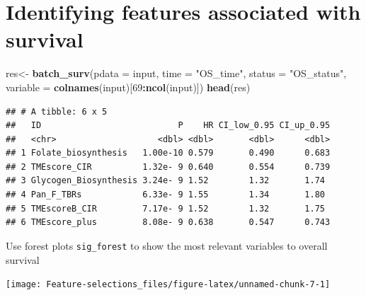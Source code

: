 \documentclass[
  12pt,
]{book}
\newenvironment{Shaded}{\begin{snugshade}}{\end{snugshade}}
\newcommand{\AttributeTok}[1]{\textcolor[rgb]{0.13,0.29,0.53}{#1}}
\newcommand{\DecValTok}[1]{\textcolor[rgb]{0.00,0.00,0.81}{#1}}
\newcommand{\FunctionTok}[1]{\textcolor[rgb]{0.13,0.29,0.53}{\textbf{#1}}}
\newcommand{\NormalTok}[1]{#1}
\newcommand{\OtherTok}[1]{\textcolor[rgb]{0.56,0.35,0.01}{#1}}
\newcommand{\SpecialCharTok}[1]{\textcolor[rgb]{0.81,0.36,0.00}{\textbf{#1}}}
\newcommand{\StringTok}[1]{\textcolor[rgb]{0.31,0.60,0.02}{#1}}
\begin{document}
\hypertarget{identifying-features-associated-with-survival}{%
\section{Identifying features associated with survival}\label{identifying-features-associated-with-survival}}

\begin{Shaded}
\begin{Highlighting}[]
\NormalTok{res}\OtherTok{\textless{}{-}} \FunctionTok{batch\_surv}\NormalTok{(}\AttributeTok{pdata    =}\NormalTok{ input,}
                 \AttributeTok{time     =} \StringTok{"OS\_time"}\NormalTok{, }
                 \AttributeTok{status   =} \StringTok{"OS\_status"}\NormalTok{, }
                 \AttributeTok{variable =} \FunctionTok{colnames}\NormalTok{(input)[}\DecValTok{69}\SpecialCharTok{:}\FunctionTok{ncol}\NormalTok{(input)])}
\FunctionTok{head}\NormalTok{(res)}
\end{Highlighting}
\end{Shaded}

\begin{verbatim}
## # A tibble: 6 x 5
##   ID                           P    HR CI_low_0.95 CI_up_0.95
##   <chr>                    <dbl> <dbl>       <dbl>      <dbl>
## 1 Folate_biosynthesis   1.00e-10 0.579       0.490      0.683
## 2 TMEscore_CIR          1.32e- 9 0.640       0.554      0.739
## 3 Glycogen_Biosynthesis 3.24e- 9 1.52        1.32       1.74 
## 4 Pan_F_TBRs            6.33e- 9 1.55        1.34       1.80 
## 5 TMEscoreB_CIR         7.17e- 9 1.52        1.32       1.75 
## 6 TMEscore_plus         8.08e- 9 0.638       0.547      0.743
\end{verbatim}

Use forest plots \texttt{sig\_forest} to show the most relevant variables to overall survival

\begin{Shaded}
\end{Shaded}

\begin{center}\texttt{[image: Feature-selections\_files/figure-latex/unnamed-chunk-7-1]} \end{center}
\end{document}
